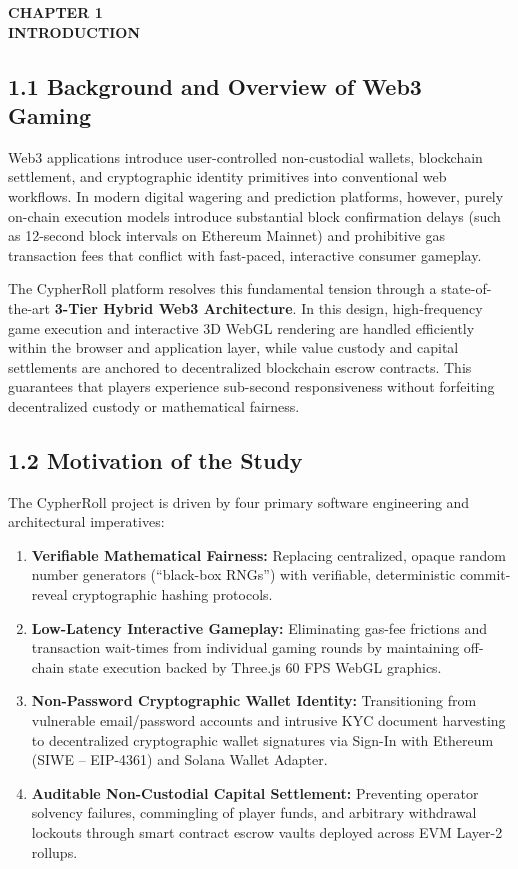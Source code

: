 \newpage
{}
\setcounter{page}{1}
\pagestyle{mainstyle}
\thispagestyle{mainstyle}

\vspace*{0.5cm}
\begin{center}
\textbf{CHAPTER 1}\\[0.15cm]
\textbf{INTRODUCTION}
\end{center}
\label{chap:intro}
\vspace{0.4cm}

\subsection*{1.1 Background and Overview of Web3 Gaming}
Web3 applications introduce user-controlled non-custodial wallets, blockchain settlement, and cryptographic identity primitives into conventional web workflows. In modern digital wagering and prediction platforms, however, purely on-chain execution models introduce substantial block confirmation delays (such as 12-second block intervals on Ethereum Mainnet) and prohibitive gas transaction fees that conflict with fast-paced, interactive consumer gameplay. 

The CypherRoll platform resolves this fundamental tension through a state-of-the-art \textbf{3-Tier Hybrid Web3 Architecture}. In this design, high-frequency game execution and interactive 3D WebGL rendering are handled efficiently within the browser and application layer, while value custody and capital settlements are anchored to decentralized blockchain escrow contracts. This guarantees that players experience sub-second responsiveness without forfeiting decentralized custody or mathematical fairness.

\subsection*{1.2 Motivation of the Study}
The CypherRoll project is driven by four primary software engineering and architectural imperatives:
\begin{enumerate}[leftmargin=*]
    \item \textbf{Verifiable Mathematical Fairness:} Replacing centralized, opaque random number generators (``black-box RNGs'') with verifiable, deterministic commit-reveal cryptographic hashing protocols.
    \item \textbf{Low-Latency Interactive Gameplay:} Eliminating gas-fee frictions and transaction wait-times from individual gaming rounds by maintaining off-chain state execution backed by Three.js 60 FPS WebGL graphics.
    \item \textbf{Non-Password Cryptographic Wallet Identity:} Transitioning from vulnerable email/password accounts and intrusive KYC document harvesting to decentralized cryptographic wallet signatures via Sign-In with Ethereum (SIWE -- EIP-4361) and Solana Wallet Adapter.
    \item \textbf{Auditable Non-Custodial Capital Settlement:} Preventing operator solvency failures, commingling of player funds, and arbitrary withdrawal lockouts through smart contract escrow vaults deployed across EVM Layer-2 rollups.
\end{enumerate}

